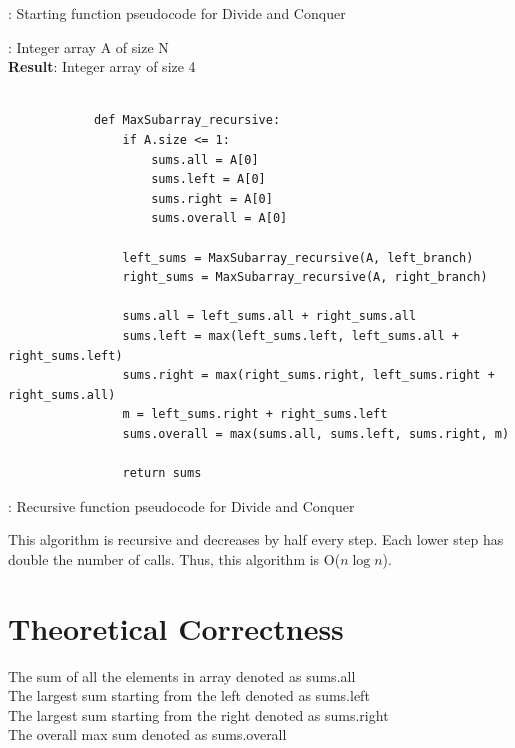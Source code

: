 \documentclass[a4paper,10pt]{article}
\begin{document}
			\begin{center}
			: Starting function pseudocode for Divide and Conquer
			\end{center}

			\vspace{1em}
			
			: Integer array A of size N \\
			{\bf Result}: Integer array of size 4

			\begin{minipage}[!h]{6in}
			\begin{verbatim}

			def MaxSubarray_recursive:
			    if A.size <= 1:
			        sums.all = A[0]
			        sums.left = A[0]
			        sums.right = A[0]
			        sums.overall = A[0]

			    left_sums = MaxSubarray_recursive(A, left_branch)
			    right_sums = MaxSubarray_recursive(A, right_branch)

			    sums.all = left_sums.all + right_sums.all
			    sums.left = max(left_sums.left, left_sums.all + right_sums.left)
			    sums.right = max(right_sums.right, left_sums.right + right_sums.all)
			    m = left_sums.right + right_sums.left
			    sums.overall = max(sums.all, sums.left, sums.right, m)

			    return sums
			\end{verbatim}
			\end{minipage}

			\begin{center}
			: Recursive function pseudocode for Divide and Conquer
			\end{center}

			\vspace{1em}

			\noindent This algorithm is recursive and decreases by half every step. Each lower step has double the number of calls. Thus, this algorithm is O($n \log n$).


	\section{Theoretical Correctness}

		The sum of all the elements in array denoted as sums.all\\
		The largest sum starting from the left denoted as sums.left\\
		The largest sum starting from the right denoted as sums.right\\
		The overall max sum denoted as sums.overall\\
\end{document}
